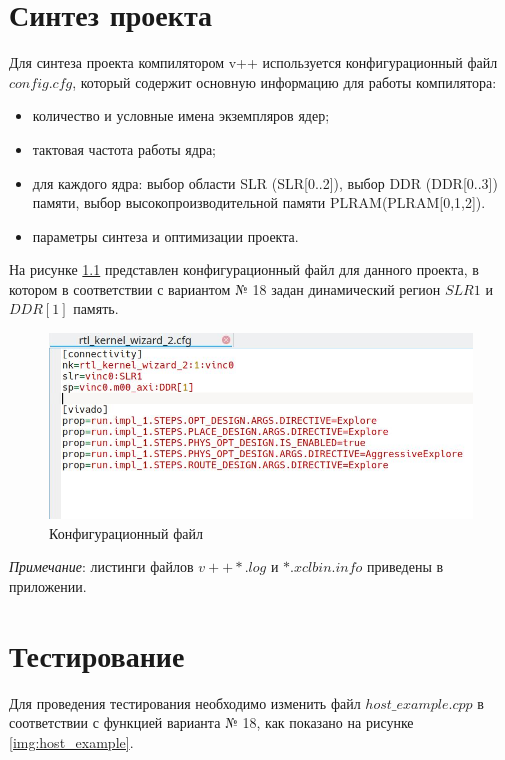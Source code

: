 \chapter{Синтез проекта}

Для синтеза проекта компилятором v++ используется конфигурационный файл $config.cfg$, который содержит основную информацию для работы компилятора:
\begin{itemize}
	\item количество и условные имена экземпляров ядер;
	\item тактовая частота работы ядра;
	\item для каждого ядра: выбор области SLR (SLR[0..2]), выбор DDR (DDR[0..3]) памяти, выбор высокопроизводительной памяти PLRAM(PLRAM[0,1,2]).
	\item параметры синтеза и оптимизации проекта.
\end{itemize}

На рисунке \ref{img:config} представлен конфигурационный файл для данного проекта, в котором в соответствии с вариантом № 18 задан динамический регион $SLR1$ и $DDR[1]$ память.

\begin{figure}[H]
	\begin{center}
		\includegraphics[scale=0.5]{img/config.png}
	\end{center}
	\captionsetup{justification=centering}
	\caption{Конфигурационный файл}
	\label{img:config}
\end{figure}

\textit{Примечание}: листинги файлов $v++*.log$ и $*.xclbin.info$ приведены в приложении.

\chapter{Тестирование}

Для проведения тестирования необходимо изменить файл $host\_example.cpp$ в соответствии с функцией варианта № 18, как показано на рисунке \ref{img:host_example}.


